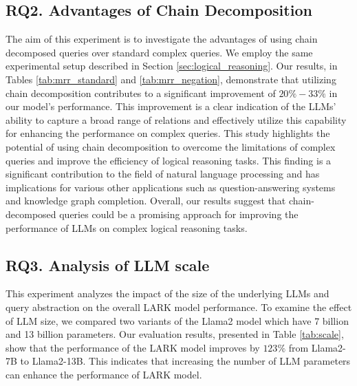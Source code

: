 \documentclass{article} %
\newcommand{\model}{LARK}
\begin{document}
\subsection{RQ2. Advantages of Chain Decomposition}
\label{sec:chain_decomp}
The aim of this experiment is to investigate the advantages of using chain decomposed queries over standard complex queries. We employ the same experimental setup described in Section \ref{sec:logical_reasoning}.
Our results{, in Tables \ref{tab:mrr_standard} and \ref{tab:mrr_negation},} demonstrate that utilizing chain decomposition contributes to a significant improvement of $20\%-33\%$ in our model's performance. This improvement is a clear indication of the LLMs' ability to capture a broad range of relations and effectively utilize this capability for enhancing the performance on complex queries. This study highlights the potential of using chain decomposition to overcome the limitations of complex queries and improve the efficiency of logical reasoning tasks. This finding is a significant contribution to the field of natural language processing and has implications for various other applications such as question-answering systems and knowledge graph completion. Overall, our results suggest that chain-decomposed queries could be a promising approach for improving the performance of LLMs on complex logical reasoning tasks.

\subsection{RQ3. Analysis of LLM scale}
\label{sec:scale}
This experiment analyzes the impact of the size of the underlying LLMs and query abstraction on the overall {\model} model performance. To examine the effect of LLM size, we compared two variants of the Llama2 model which have 7 billion and 13 billion parameters. Our evaluation results, presented in Table \ref{tab:scale}, show that the performance of the {\model} model improves by $123\%$ from Llama2-7B to Llama2-13B. This indicates that increasing the number of LLM parameters can enhance the performance of {\model} model.
\end{document}
